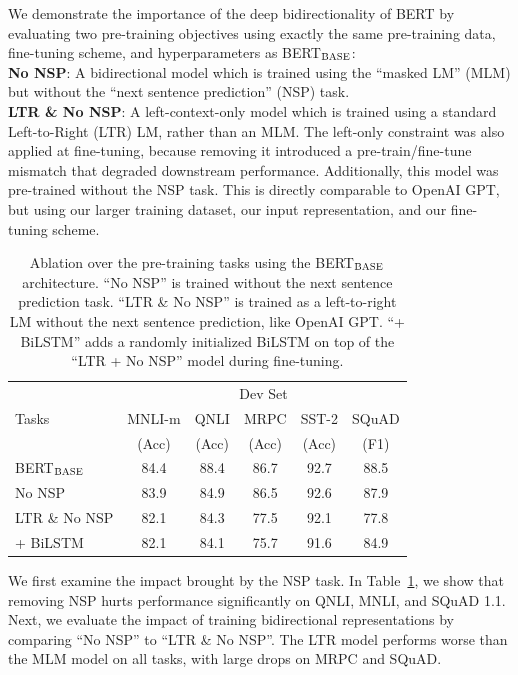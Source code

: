 \documentclass[11pt,a4paper]{article}
\newcommand\bertbase{BERT$_{\small \textsc{BASE}}$\xspace}
\begin{document}
\label{sec:task_ablation}
We demonstrate the importance of the deep bidirectionality of BERT by evaluating two pre-training objectives using exactly the same pre-training data, fine-tuning scheme, and hyperparameters as \bertbase:
\vspace{0.3cm}
\\
\noindent\textbf{No NSP}: A bidirectional model which is trained using the ``masked LM'' (MLM) but without the ``next sentence prediction'' (NSP) task.\\
\noindent\textbf{LTR \& No NSP}: A left-context-only model which is trained using a standard Left-to-Right (LTR) LM, rather than an MLM. The left-only constraint was also applied at fine-tuning, because  removing it introduced a pre-train/fine-tune mismatch that degraded downstream performance. Additionally, this model was pre-trained without the NSP task. This is directly comparable to OpenAI GPT, but using our larger training dataset, our input representation, and our fine-tuning scheme.
\begin{table}[t]
\small
 \begin{tabular}{@{}lccccc@{}}
    \toprule
              & \multicolumn{5}{c}{Dev Set} \\
   Tasks & MNLI-m & QNLI & MRPC & SST-2 & SQuAD     \\
         & (Acc) & (Acc) & (Acc) & (Acc) & (F1)     \\
     \midrule
\bertbase       & 84.4 & 88.4 & 86.7 & 92.7 & 88.5 \\
No NSP          & 83.9 & 84.9 & 86.5 & 92.6 & 87.9 \\
LTR \& No NSP   & 82.1 & 84.3 & 77.5 & 92.1 & 77.8 \\
\quad + BiLSTM  & 82.1 & 84.1 & 75.7 & 91.6 & 84.9 \\
     \bottomrule
   \end{tabular}
   \caption{Ablation over the pre-training tasks using the \bertbase architecture. ``No NSP'' is trained without the next sentence prediction task. ``LTR \& No NSP'' is trained as a left-to-right LM without the next sentence prediction, like OpenAI GPT. ``+ BiLSTM'' adds a randomly initialized BiLSTM on top of the ``LTR + No NSP'' model during fine-tuning.
   }
   \label{tab:task_ablation}    
\end{table}

We first examine the impact brought by the NSP task. In Table~\ref{tab:task_ablation}, we show that removing NSP hurts performance significantly on QNLI, MNLI, and SQuAD 1.1. Next, we evaluate the impact of training bidirectional representations by comparing ``No NSP'' to ``LTR \& No NSP''. The LTR model performs worse than the MLM model on all tasks, with large drops on MRPC and SQuAD.
\end{document}

